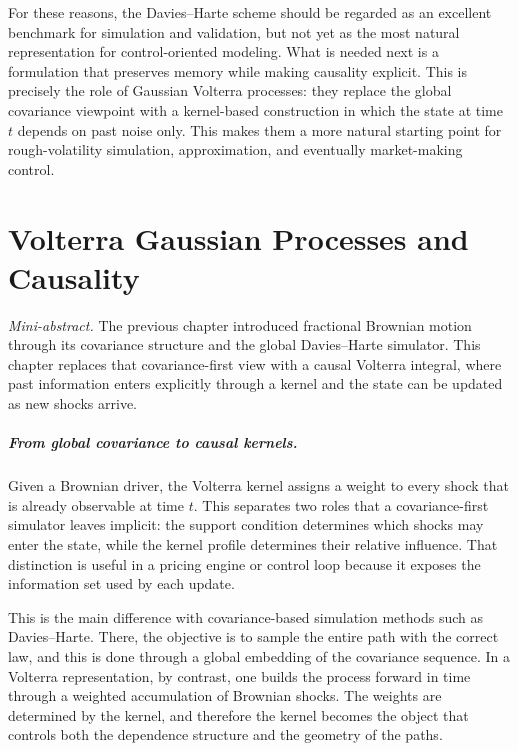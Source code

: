\documentclass[a4paper,10pt,titlepage,oneside,openany]{book}
\theoremstyle{plain}
\theoremstyle{definition}
\theoremstyle{remark}
\newcommand{\miniabstract}[1]{%
\vspace{-2pt}
\begin{tcolorbox}[colback=gray!6,colframe=black!15,boxrule=0.3pt,arc=3pt,left=6pt,right=6pt,top=4pt,bottom=4pt]
\textit{Mini-abstract.} #1
\end{tcolorbox}
\vspace{-4pt}
}
\newcommand{\1}{\mathbf{1}}
\begin{document}
For these reasons, the Davies--Harte scheme should be regarded as an excellent benchmark for simulation and validation, but not yet as the most natural representation for control-oriented modeling. What is needed next is a formulation that preserves memory while making causality explicit. This is precisely the role of Gaussian Volterra processes: they replace the global covariance viewpoint with a kernel-based construction in which the state at time \(t\) depends on past noise only. This makes them a more natural starting point for rough-volatility simulation, approximation, and eventually market-making control.


\chapter{Volterra Gaussian Processes and Causality}
\miniabstract{The previous chapter introduced fractional Brownian motion through its covariance structure and the global Davies--Harte simulator. This chapter replaces that covariance-first view with a causal Volterra integral, where past information enters explicitly through a kernel and the state can be updated as new shocks arrive.}

\paragraph{From global covariance to causal kernels.}

Given a Brownian driver, the Volterra kernel assigns a weight to every shock that is already observable at time \(t\). This separates two roles that a covariance-first simulator leaves implicit: the support condition determines which shocks may enter the state, while the kernel profile determines their relative influence. That distinction is useful in a pricing engine or control loop because it exposes the information set used by each update.

This is the main difference with covariance-based simulation methods such as Davies--Harte. There, the objective is to sample the entire path with the correct law, and this is done through a global embedding of the covariance sequence. In a Volterra representation, by contrast, one builds the process forward in time through a weighted accumulation of Brownian shocks. The weights are determined by the kernel, and therefore the kernel becomes the object that controls both the dependence structure and the geometry of the paths.
\end{document}
